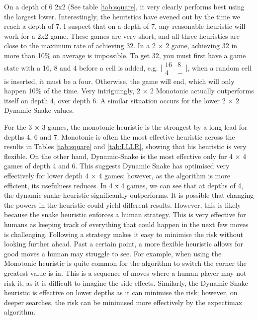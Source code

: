 \documentclass{article}
\begin{document}
On a depth of 6 2x2 (See table \ref{tab:square}, it very clearly performs best using the largest lower. Interestingly, the heuristics have evened out by the time we reach a depth of 7. I suspect that on a depth of 7, any reasonable heuristic will work for a 2x2 game. These games are very short, and all three heuristics are close to the maximum rate of achieving 32. In a 2 × 2 game, achieving 32 in more than 10\% on average is impossible. To get 32, you must first have a game state with a 16, 8 and 4 before a cell is added, e.g. $\big[\begin{smallmatrix}
  16 & 8\\
  4 & -
\end{smallmatrix}\big]$,
when a random cell is inserted, it must be a four. Otherwise, the game will end, which will only happen 10\% of the time. Very intriguingly, 2 × 2 Monotonic actually outperforms itself on depth 4, over depth 6. A similar situation occurs for the lower 2 × 2 Dynamic Snake values.

For the 3 × 3 games, the monotonic heuristic is the strongest by a long lead for depths 4, 6 and 7. Monotonic is often the most effective heuristic across the results in Tables \ref{tab:square} and \ref{tab:LLLR}, showing that his heuristic is very flexible. On the other hand, Dynamic-Snake is the most effective only for 4 × 4 games of depth 4 and 6. This suggests Dynamic Snake has optimised very effectively for lower depth 4 × 4 games; however, as the algorithm is more efficient, its usefulness reduces.
In 4 x 4 games, we can see that at depths of 4, the dynamic snake heuristic significantly outperforms. It is possible that changing the powers in the heuristic could yield different results. However, this is likely because the snake heuristic enforces a human strategy. This is very effective for humans as keeping track of everything that could happen in the next few moves is challenging. Following a strategy makes it easy to minimise the risk without looking further ahead. Past a certain point, a more flexible heuristic allows for good moves a human may struggle to see. For example, when using the Monotonic heuristic is quite common for the algorithm to switch the corner the greatest value is in. This is a sequence of moves where a human player may not risk it, as it is difficult to imagine the side effects. Similarly, the Dynamic Snake heuristic is effective on lower depths as it can minimise the risk; however, on deeper searches, the risk can be minimised more effectively by the expectimax algorithm.  
\end{document}
